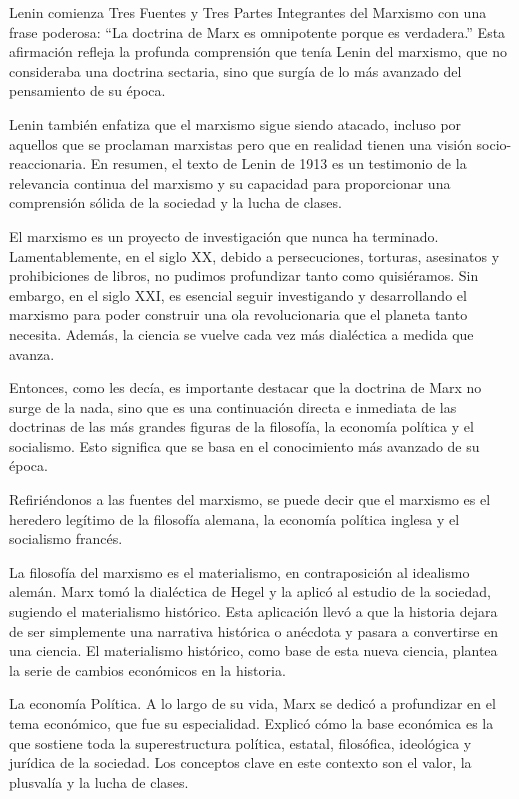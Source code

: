 \documentclass[
  a4paper,
]{article}
\begin{document}
Lenin comienza Tres Fuentes y Tres Partes Integrantes del Marxismo con
una frase poderosa: ``La doctrina de Marx es omnipotente porque es
verdadera.'' Esta afirmación refleja la profunda comprensión que tenía
Lenin del marxismo, que no consideraba una doctrina sectaria, sino que
surgía de lo más avanzado del pensamiento de su época.

Lenin también enfatiza que el marxismo sigue siendo atacado, incluso por
aquellos que se proclaman marxistas pero que en realidad tienen una
visión socio-reaccionaria. En resumen, el texto de Lenin de 1913 es un
testimonio de la relevancia continua del marxismo y su capacidad para
proporcionar una comprensión sólida de la sociedad y la lucha de clases.

El marxismo es un proyecto de investigación que nunca ha terminado.
Lamentablemente, en el siglo XX, debido a persecuciones, torturas,
asesinatos y prohibiciones de libros, no pudimos profundizar tanto como
quisiéramos. Sin embargo, en el siglo XXI, es esencial seguir
investigando y desarrollando el marxismo para poder construir una ola
revolucionaria que el planeta tanto necesita. Además, la ciencia se
vuelve cada vez más dialéctica a medida que avanza.

Entonces, como les decía, es importante destacar que la doctrina de Marx
no surge de la nada, sino que es una continuación directa e inmediata de
las doctrinas de las más grandes figuras de la filosofía, la economía
política y el socialismo. Esto significa que se basa en el conocimiento
más avanzado de su época.

Refiriéndonos a las fuentes del marxismo, se puede decir que el marxismo
es el heredero legítimo de la filosofía alemana, la economía política
inglesa y el socialismo francés.

La filosofía del marxismo es el materialismo, en contraposición al
idealismo alemán. Marx tomó la dialéctica de Hegel y la aplicó al
estudio de la sociedad, sugiendo el materialismo histórico. Esta
aplicación llevó a que la historia dejara de ser simplemente una
narrativa histórica o anécdota y pasara a convertirse en una ciencia. El
materialismo histórico, como base de esta nueva ciencia, plantea la
serie de cambios económicos en la historia.

La economía Política. A lo largo de su vida, Marx se dedicó a
profundizar en el tema económico, que fue su especialidad. Explicó cómo
la base económica es la que sostiene toda la superestructura política,
estatal, filosófica, ideológica y jurídica de la sociedad. Los conceptos
clave en este contexto son el valor, la plusvalía y la lucha de clases.
\end{document}
